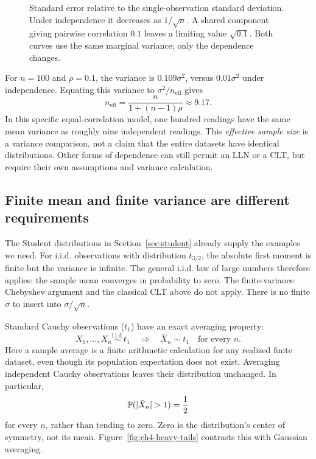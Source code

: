 \begin{figure}[H]
  \centering
  
  \caption{Standard error relative to the single-observation standard
  deviation. Under independence it decreases as \(1/\sqrt n\).
  A shared component giving pairwise correlation \(0.1\) leaves a
  limiting value \(\sqrt{0.1}\). Both curves use the same marginal
  variance; only the dependence changes.}
  \label{fig:ch4-dependence}
\end{figure}

For \(n=100\) and \(\rho=0.1\), the variance is
\(0.109\sigma^2\), versus \(0.01\sigma^2\) under independence.
Equating this variance to \(\sigma^2/n_{\mathrm{eff}}\) gives
\[
  n_{\mathrm{eff}}=\frac{n}{1+(n-1)\rho}\approx9.17.
\]
In this specific equal-correlation model, one hundred readings have
the same mean variance as roughly nine independent readings. This
\emph{effective sample size} is a variance comparison, not a claim
that the entire datasets have identical distributions. Other forms
of dependence can still permit an LLN or a CLT, but require their
own assumptions and variance calculation.

\subsection{Finite mean and finite variance are different requirements}

The Student distributions in Section~\ref{sec:student} already supply
the examples we need. For i.i.d. observations with distribution
\(t_{3/2}\), the absolute first moment is finite but the variance is
infinite. The general i.i.d. law of large numbers therefore applies:
the sample mean converges in probability to zero. The finite-variance
Chebyshev argument and the classical CLT above do not apply. There is
no finite \(\sigma\) to insert into \(\sigma/\sqrt n\).

Standard Cauchy observations (\(t_1\)) have an exact averaging property:
\begin{equation}
  X_1,\ldots,X_n\stackrel{\mathrm{i.i.d.}}{\sim}t_1
  \quad\Longrightarrow\quad
  \bar X_n\sim t_1\quad\text{for every }n.
  \label{eq:cauchy-average}
\end{equation}
Here a sample average is a finite arithmetic calculation for any
realized finite dataset, even though its population expectation does
not exist. Averaging independent Cauchy observations leaves their
distribution unchanged. In particular,
\[
  \Prob(|\bar X_n|>1)=\frac12
\]
for every \(n\), rather than tending to zero. Zero is the distribution's
center of symmetry, not its mean. Figure~\ref{fig:ch4-heavy-tails}
contrasts this with Gaussian averaging.

